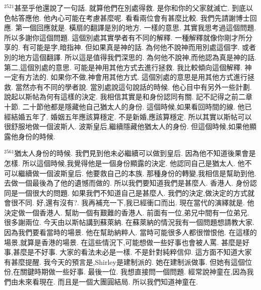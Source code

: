 \documentclass{book}
\begin{document}
$^{2521}$甚至乎他還說了一句話.
就算他們在別處得救.
是你和你的父家就滅亡.
到底以色帖答應他.
他內心可能在考慮甚麼呢.
看看兩位會有甚麼比較.
我們先請謝博士回應.
第一個回應就是.
橫扇的翻譯是別的地方.
一樣的意思.
其實我思考過這個問題.
所以多謝你這個問題.
這個別處其實學者有不同的解釋.
一種解釋就像你剛才所分享的.
有可能是字,暗指神.
但如果真是神的話.
為何他不說神而用別處這個字.
或者別的地方這個翻譯.
所以這是值得我們深思的.
為何他不說神,而他認為真是神的話.
第二,這個別處的意思.
可能是神用其他方式去進行拯救.
我比較傾向這個解釋.
神一定有方法的.
如果你不做,神會用其他方式.
這個別處的意思是用其他方式進行拯救.
當然亦有不同的學者說.
當別處說這句說話的時候.
他心目中有另外一些計劃.
說起以斯帖為何有這樣的決定.
我相信其實是和身份認同有關.
記不記得之前二章十節.
二十節他都是隱藏他自己猶太人的身份.
這個時候,如果看回時間的線.
他已經結婚五年了.
婚姻五年應該算穩定.
不是新婚,應該算穩定.
所以其實以斯帖可以很舒服地做一個波斯人.
波斯皇后,繼續隱藏他猶太人的身份.
但這個時候,如果他顯露他身份的時候.

$^{2561}$猶太人身份的時候.
我們見到他未必繼續可以做到皇后.
因為他不知道後果會是怎樣.
所以這個時候,我覺得他是一個身份顯露的決定.
他認同自己是猶太人.
他不可以繼續做一個波斯皇后.
他要救自己的本族.
那種身份的轉變,我相信是幫助到他.
去做一個最後為了他的遺憾而做的.
所以我們要知道我們是甚麼人.
香港人.
身份認同是一個很大的問題.
如果我們不知道自己是甚麼人.
我們的決定,做決定的方式就會很不同.
好,還有沒有?.
我再補充一下,我已經衝口而出.
現在當代的演繹就是.
他決定做一個香港人.
幫助一個有艱難的香港人.
前面有一位,弟兄中間有一位弟兄.
很多謝兩位.
今天由以斯帖講到蘇萊納.
在蘇萊納的情況我有一個問題想請教大家.
因為我們要看當時的場景.
他在幫助納粹人.
當時可能很多人都很憎恨他.
在這樣的場景,就算是香港的場景.
在這些情況下,可能想做一些好事也會被人罵.
甚麼是好事,甚麼是不好事.
大家的看法未必是一樣.
不是針對純粹信仰.
這方面不知道大家有甚麼提醒.
我今天的預言是,Shirley是建制派的.
她在建制派做事.
但她有這個位份,在關鍵時期做一些好事.
最後一位.
我想直接問一個問題.
經常說神童在,因為我們由未來看現在.
而且是一個大團圓結局.
所以我們知道神童在.
\end{document}
